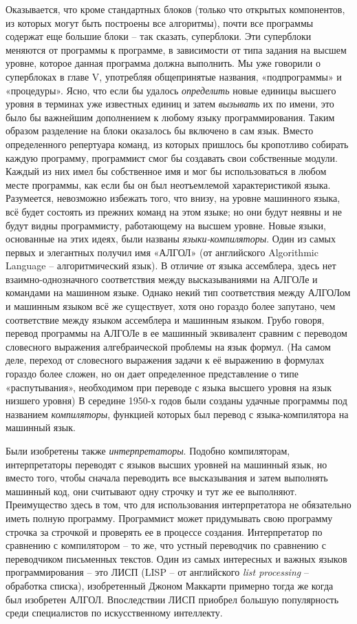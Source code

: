 \documentclass[../main.tex]{subfiles}
\begin{document}
Оказывается, что кроме стандартных блоков (только что открытых компонентов, из которых могут быть построены все алгоритмы), почти все программы содержат еще большие блоки \--- так сказать, суперблоки. Эти суперблоки меняются от программы к программе, в зависимости от типа задания на высшем уровне, которое данная программа должна выполнить. Мы уже говорили о суперблоках в главе V, употребляя общепринятые названия, «подпрограммы» и «процедуры». Ясно, что если бы удалось \emph{определить} новые единицы высшего уровня в терминах уже известных единиц и затем \emph{вызывать} их по имени, это было бы важнейшим дополнением к любому языку программирования. Таким образом разделение на блоки оказалось бы включено в сам язык. Вместо определенного репертуара команд, из которых пришлось бы кропотливо собирать каждую программу, программист смог бы создавать свои собственные модули. Каждый из них имел бы собственное имя и мог бы использоваться в любом месте программы, как если бы он был неотъемлемой характеристикой языка. Разумеется, невозможно избежать того, что внизу, на уровне машинного языка, всё будет состоять из прежних команд на этом языке; но они будут неявны и не будут видны программисту, работающему на высшем уровне. Новые языки, основанные на этих идеях, были названы \emph{языки-компиляторы}. Один из самых первых и элегантных получил имя «АЛГОЛ» (от английского Algorithmic Language \--- алгоритмический язык). В отличие от языка ассемблера, здесь нет взаимно-однозначного соответствия между высказываниями на АЛГОЛе и командами на машинном языке. Однако некий тип соответствия между АЛГОЛом и машинным языком всё же существует, хотя оно гораздо более запутано, чем соответствие между языком ассемблера и машинным языком. Грубо говоря, перевод программы на АЛГОЛе в ее машинный эквивалент сравним с переводом словесного выражения алгебраической проблемы на язык формул. (На самом деле, переход от словесного выражения задачи к её выражению в формулах гораздо более сложен, но он дает определенное представление о типе «распутывания», необходимом при переводе с языка высшего уровня на язык низшего уровня) В середине 1950-х годов были созданы удачные программы под названием \emph{компиляторы}, функцией которых был перевод с языка-компилятора на машинный язык.

Были изобретены также \emph{интерпретаторы}. Подобно компиляторам, интерпретаторы переводят с языков высших уровней на машинный язык, но вместо того, чтобы сначала переводить все высказывания и затем выполнять машинный код, они считывают одну строчку и тут же ее выполняют. Преимущество здесь в том, что для использования интерпретатора не обязательно иметь полную программу. Программист может придумывать свою программу строчка за строчкой и проверять ее в процессе создания. Интерпретатор по сравнению с компилятором \--- то же, что устный переводчик по сравнению с переводчиком письменных текстов. Один из самых интересных и важных языков программирования \--- это ЛИСП (LISP \--- от английского \emph{list processing} \--- обработка списка), изобретенный Джоном Маккарти примерно тогда же когда был изобретен АЛГОЛ\@. Впоследствии ЛИСП приобрел большую популярность среди специалистов по искусственному интеллекту.
\end{document}
